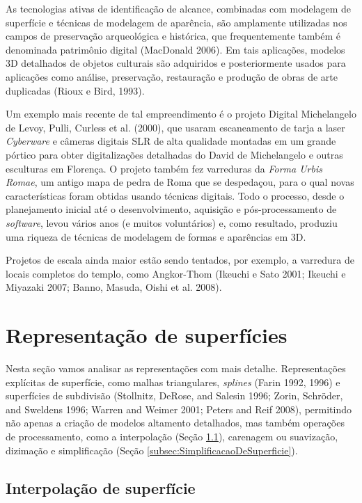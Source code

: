 \documentclass{article}
\begin{document}
As tecnologias ativas de identificação de alcance, combinadas com modelagem de superfície e técnicas de modelagem de aparência, são amplamente utilizadas nos campos de preservação arqueológica e histórica, que frequentemente também é denominada patrimônio digital (MacDonald 2006). Em tais aplicações, modelos 3D detalhados de objetos culturais são adquiridos e posteriormente usados para aplicações como análise, preservação, restauração e produção de obras de arte duplicadas (Rioux e Bird, 1993).

Um exemplo mais recente de tal empreendimento é o projeto Digital Michelangelo de Levoy, Pulli, Curless et al. (2000), que usaram escaneamento de tarja a laser \textit{Cyberware} e câmeras digitais SLR de alta qualidade montadas em um grande pórtico para obter digitalizações detalhadas do David de Michelangelo e outras esculturas em Florença. O projeto também fez varreduras da \textit{Forma Urbis Romae}, um antigo mapa de pedra de Roma que se despedaçou, para o qual novas características foram obtidas usando técnicas digitais. Todo o processo, desde o planejamento inicial até o desenvolvimento, aquisição e pós-processamento de \textit{software}, levou vários anos (e muitos voluntários) e, como resultado, produziu uma riqueza de técnicas de modelagem de formas e aparências em 3D.

Projetos de escala ainda maior estão sendo tentados, por exemplo, a varredura de locais completos do templo, como Angkor-Thom (Ikeuchi e Sato 2001; Ikeuchi e Miyazaki 2007; Banno, Masuda, Oishi et al. 2008).



\section{Representação de superfícies}

Nesta seção vamos analisar as representações com mais detalhe. Representações explícitas de superfície, como malhas triangulares, \textit{splines} (Farin 1992, 1996) e superfícies de subdivisão (Stollnitz, DeRose, and Salesin 1996; Zorin, Schröder, and Sweldens 1996; Warren and Weimer 2001; Peters and Reif 2008), permitindo não apenas a criação de modelos altamento detalhados, mas também operações de processamento, como a interpolação (Seção \ref{subsec:InterpolacaoDeSuperficie}), carenagem ou suavização, dizimação e simplificação (Seção \ref{subsec:SimplificacaoDeSuperficie}).

\subsection{Interpolação de superfície}
\label{subsec:InterpolacaoDeSuperficie}
\end{document}
